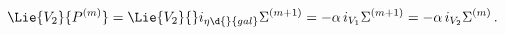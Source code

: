 \begin{equation*}
  \Lie{V_{2}}{P^{(m)}} = \Lie{V_{2}}{}i_{\eta\d{}{gal}} \Sigma^{(m+1)}
  = -\alpha\, i_{V_1}\Sigma^{(m+1)} = -\alpha \,i_{V_{2}}\Sigma^{(m)}\,.
\end{equation*}

